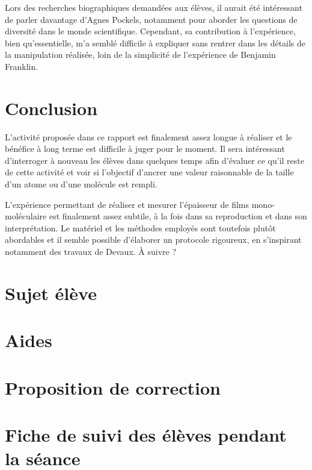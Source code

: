 \documentclass[12pt,a4paper]{article}
\begin{document}
Lors des recherches biographiques demandées aux élèves, il aurait été intéressant de parler davantage d'Agnes Pockels, notamment pour aborder les questions de diversité dans le monde scientifique.
Cependant, sa contribution à l'expérience, bien qu'essentielle, m'a semblé difficile à expliquer sans rentrer dans les détails de la manipulation réalisée, loin de la simplicité de l'expérience de Benjamin Franklin.

\section*{Conclusion}

L'activité proposée dans ce rapport est finalement assez longue à réaliser et le bénéfice à long terme est difficile à juger pour le moment.
Il sera intéressant d'interroger à nouveau les élèves dans quelques temps afin d'évaluer ce qu'il reste de cette activité et voir si l'objectif d'ancrer une valeur raisonnable de la taille d'un atome ou d'une molécule est rempli.

L'expérience permettant de réaliser et mesurer l'épaisseur de films mono-moléculaire est finalement assez subtile, à la fois dans sa reproduction et dans son interprétation.
Le matériel et les méthodes employés sont toutefois plutôt abordables et il semble possible d'élaborer un protocole rigoureux, en s'inspirant notamment des travaux de Devaux.
À suivre ?

\newpage
\appendix



\newpage
\appendix



\section{Sujet élève}
\label{ann:sujet}



\section{Aides}
\label{ann:aides}



\section{Proposition de correction}
\label{ann:corr}



\section{Fiche de suivi des élèves pendant la séance}


\end{document}
